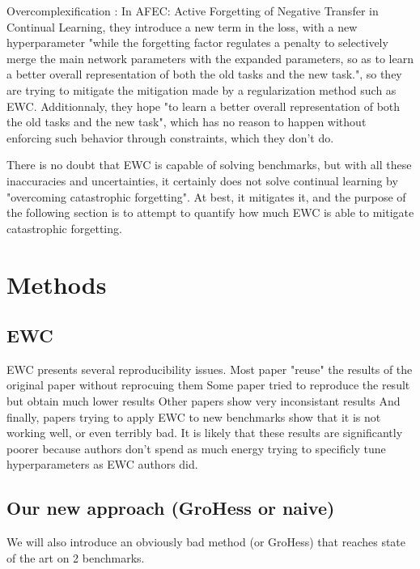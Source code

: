 \documentclass[11pt]{article}
\begin{document}
\vspace{1mm}
\noindent
Overcomplexification : In AFEC: Active Forgetting of Negative Transfer in Continual Learning, they introduce a new term in the loss, with a new hyperparameter "while the forgetting factor regulates a penalty to selectively merge the main network parameters with the expanded parameters, so as to learn a better overall representation of both the old tasks and the new task.", so they are trying to mitigate the mitigation made by a regularization method such as EWC. Additionnaly, they hope "to learn a better overall representation of both the old tasks and the new task", which has no reason to happen without enforcing such behavior through constraints, which they don't do.

There is no doubt that EWC is capable of solving benchmarks, but with all these inaccuracies and uncertainties, it certainly does not solve continual learning by "overcoming catastrophic forgetting". At best, it mitigates it, and the purpose of the following section is to attempt to quantify how much EWC is able to mitigate catastrophic forgetting.



\section{Methods}



\subsection{EWC}

EWC presents several reproducibility issues.
Most paper "reuse" the results of the original paper without reprocuing them
Some paper tried to reproduce the result but obtain much lower results
Other papers show very inconsistant results
And finally, papers trying to apply EWC to new benchmarks show that it is not working well, or even terribly bad. It is likely that these results are significantly poorer because authors don't spend as much energy trying to specificly tune hyperparameters as EWC authors did.


\subsection{Our new approach (GroHess or naive)}

We will also introduce an obviously bad method (or GroHess) that reaches state of the art on 2 benchmarks.
\end{document}
